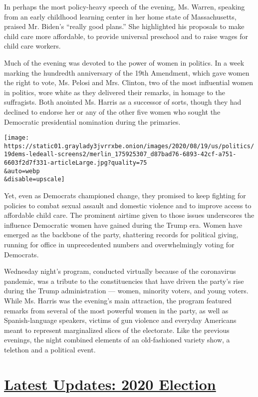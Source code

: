 In perhaps the most policy-heavy speech of the evening, Ms. Warren,
speaking from an early childhood learning center in her home state of
Massachusetts, praised Mr. Biden's ``really good plans.'' She
highlighted his proposals to make child care more affordable, to provide
universal preschool and to raise wages for child care workers.

Much of the evening was devoted to the power of women in politics. In a
week marking the hundredth anniversary of the 19th Amendment, which gave
women the right to vote, Ms. Pelosi and Mrs. Clinton, two of the most
influential women in politics, wore white as they delivered their
remarks, in homage to the suffragists. Both anointed Ms. Harris as a
successor of sorts, though they had declined to endorse her or any of
the other five women who sought the Democratic presidential nomination
during the primaries.

\texttt{[image: https://static01.graylady3jvrrxbe.onion/images/2020/08/19/us/politics/19dems-ledeall-screens2/merlin\_175925307\_d87bad76-6893-42cf-a751-6603f2d7f331-articleLarge.jpg?quality=75\\\&auto=webp\\\&disable=upscale]}

Yet, even as Democrats championed change, they promised to keep fighting
for policies to combat sexual assault and domestic violence and to
improve access to affordable child care. The prominent airtime given to
those issues underscores the influence Democratic women have gained
during the Trump era. Women have emerged as the backbone of the party,
shattering records for political giving, running for office in
unprecedented numbers and overwhelmingly voting for Democrats.

Wednesday night's program, conducted virtually because of the
coronavirus pandemic, was a tribute to the constituencies that have
driven the party's rise during the Trump administration --- women,
minority voters, and young voters. While Ms. Harris was the evening's
main attraction, the program featured remarks from several of the most
powerful women in the party, as well as Spanish-language speakers,
victims of gun violence and everyday Americans meant to represent
marginalized slices of the electorate. Like the previous evenings, the
night combined elements of an old-fashioned variety show, a telethon and
a political event.

\hypertarget{latest-updates-2020-election}{%
\section{\texorpdfstring{\href{https://www.nytimes3xbfgragh.onion/live/2020/08/19/us/dnc-convention-election?action=click\&pgtype=Article\&state=default\&region=MAIN_CONTENT_1\&context=storylines_live_updates}{Latest
Updates: 2020
Election}}{Latest Updates: 2020 Election}}\label{latest-updates-2020-election}}

